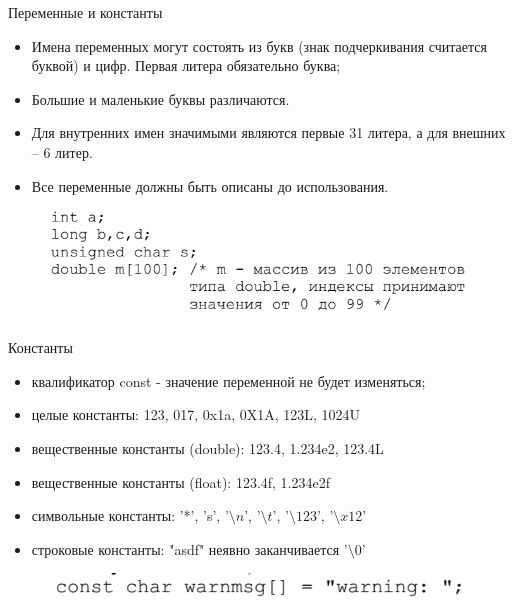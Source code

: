\documentclass{beamer}
\begin{document}
\begin{frame}{Переменные и константы}
\begin{itemize}
\item Имена переменных могут состоять из букв (знак подчеркивания считается буквой) и цифр. Первая литера обязательно буква;
\item Большие и маленькие буквы различаются.
\item Для внутренних имен значимыми являются первые 31 литера, а для внешних – 6 литер.
\item Все переменные должны быть описаны до использования.
\end{itemize}
\begin{figure}[h]
\centering
\includegraphics[scale=0.6]{images/lec02-pic01.png}
\end{figure}
\end{frame}

\begin{frame}{Константы}
\begin{itemize}
\item квалификатор const - значение переменной не будет изменяться;
\item целые константы: 123, 017, 0x1a, 0X1A, 123L, 1024U
\item вещественные константы (double): 123.4, 1.234e2, 123.4L
\item вещественные константы (float): 123.4f, 1.234e2f
\item символьные константы: '*', 's', '$\setminus n$', '$\setminus t$', '$\setminus 123$', '$\setminus x12$'
\item строковые константы: "asdf"  неявно заканчивается '$\setminus 0$'
\end{itemize}
\begin{figure}[h]
\centering
\includegraphics[scale=0.6]{images/lec02-pic02.png}
\end{figure}
\end{frame}
\end{document}
